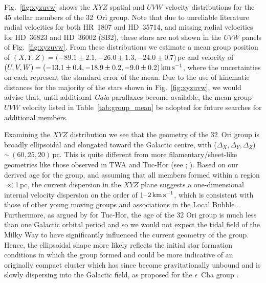 \documentclass[usenatbib]{mnras}
\newcommand{\masyr}{mas\,yr$^{-1}$}
\newcommand{\kms}{\textrm{km\,s$^{-1}$}}
\begin{document}
Fig.~\ref{fig:xyzuvw} shows the $XYZ$ spatial and $UVW$ velocity
distributions for the 45 stellar members of the 32~Ori group. Note
that due to unreliable literature radial velocities for both HR~1807
and HD~35714, and missing radial velocities for HD~36823 and
HD~36002 (SB2), these stars are not
shown in the $UVW$ panels of Fig.~\ref{fig:xyzuvw}. From these distributions
we estimate a mean group position of $(X,Y,Z) = (-89.1\pm2.1, -26.0\pm1.3, -24.0\pm0.7$)\,pc
and velocity of $(U,V,W) = (-13.1\pm0.4, -18.9\pm0.2, -9.0\pm0.2)\,\rm{km\,s^{-1}}$,
where the uncertainties on each represent the standard error of the mean.
Due to the use of kinematic distances for the majority of the stars
shown in Fig.~\ref{fig:xyzuvw}, we would advise that, until additional
\emph{Gaia} parallaxes become available, the mean group $UVW$
velocity listed in Table~\ref{tab:group_mean} be adopted for future
searches for additional members.

Examining the $XYZ$ distribution we see that the geometry of the
32~Ori group is broadly ellipsoidal and elongated toward the Galactic
centre, with ($\Delta_{X}, \Delta_{Y}, \Delta_{Z}$)\,$\sim$\,$(60, 25,
20)$\,pc. This is quite different from more filamentary/sheet-like
geometries like those observed in TWA and Tuc-Hor (see
\citealp*{Weinberger13}; \citealp{Kraus14}). Based on our derived age
for the group, and assuming that all members formed within a region
$\ll$1\,pc, the current dispersion in the $XYZ$ plane suggests a
one-dimensional internal velocity dispersion on the order of
1--$2\,\rm{km\,s^{-1}}$, which is consistent with those of other young
moving groups and associations in the Local Bubble \citep{Mamajek16}.
Furthermore, as argued by \cite{Kraus14} for Tuc-Hor, the age of the
32 Ori group is much less than one Galactic orbital period and so we
would not expect the tidal field of the Milky Way to have
significantly influenced the current geometry of the group. Hence, the
ellipsoidal shape more likely reflects the initial star formation
conditions in which the group formed and could be more indicative of
an originally compact cluster which has since become gravitationally
unbound and is slowly dispersing into the Galactic field, as proposed
for the $\epsilon$~Cha group \citep*{Murphy13}.
\end{document}
